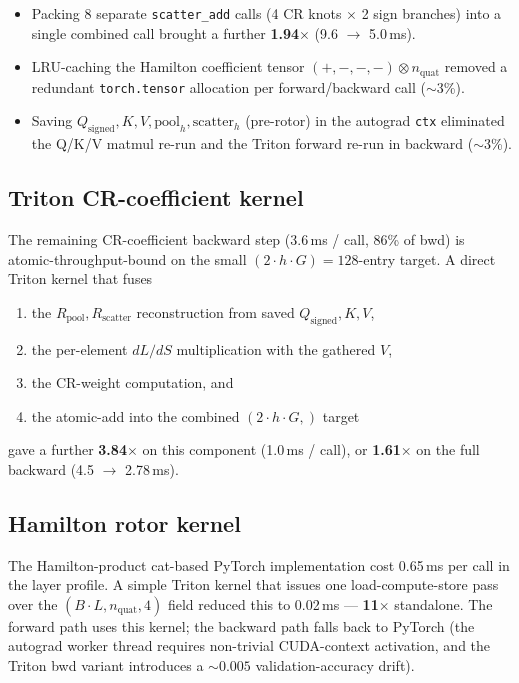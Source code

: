 \documentclass[10pt,a4paper]{article}
\begin{document}
\begin{itemize}[noitemsep]
\item Packing 8 separate \texttt{scatter\_add} calls (4 CR knots
      $\times$ 2 sign branches) into a single combined call brought
      a further \textbf{1.94$\times$} (9.6 $\to$ 5.0\,ms).
\item LRU-caching the Hamilton coefficient tensor
      $(+, -, -, -) \otimes n_{\text{quat}}$ removed a redundant
      \texttt{torch.tensor} allocation per forward/backward call
      ($\sim$3\%).
\item Saving $Q_{\text{signed}}, K, V, \mathrm{pool}_h, \mathrm{scatter}_h$
      (pre-rotor) in the autograd \texttt{ctx} eliminated the Q/K/V
      matmul re-run and the Triton forward re-run in backward
      ($\sim$3\%).
\end{itemize}

\subsection{Triton CR-coefficient kernel}

The remaining CR-coefficient backward step (3.6\,ms / call, 86\% of bwd)
is atomic-throughput-bound on the small $(2 \cdot h \cdot G) = 128$-entry
target. A direct Triton kernel that fuses
\begin{enumerate}[noitemsep]
\item the $R_{\text{pool}}, R_{\text{scatter}}$ reconstruction from
      saved $Q_{\text{signed}}, K, V$,
\item the per-element $dL/dS$ multiplication with the gathered $V$,
\item the CR-weight computation, and
\item the atomic-add into the combined $(2 \cdot h \cdot G,)$ target
\end{enumerate}
gave a further \textbf{3.84$\times$} on this component (1.0\,ms /
call), or \textbf{1.61$\times$} on the full backward (4.5 $\to$ 2.78\,ms).

\subsection{Hamilton rotor kernel}

The Hamilton-product cat-based PyTorch implementation cost 0.65\,ms
per call in the layer profile. A simple Triton kernel that issues one
load-compute-store pass over the $(B \cdot L, n_{\text{quat}}, 4)$
field reduced this to 0.02\,ms ---  \textbf{11$\times$} standalone.
The forward path uses this kernel; the backward path falls back to
PyTorch (the autograd worker thread requires non-trivial
CUDA-context activation, and the Triton bwd variant introduces a
$\sim 0.005$ validation-accuracy drift).
\end{document}
